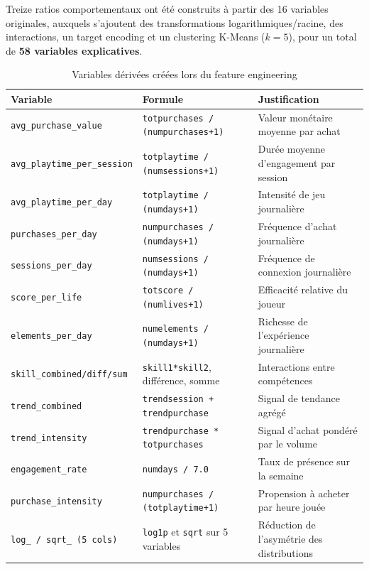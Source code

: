 \documentclass[11pt,a4paper]{article}
\newcommand{\code}[1]{\texttt{\small #1}}
\begin{document}
Treize ratios comportementaux ont été construits à partir des 16 variables
originales, auxquels s'ajoutent des transformations logarithmiques/racine,
des interactions, un target encoding et un clustering K-Means ($k=5$), pour
un total de \textbf{58 variables explicatives}.

\begin{table}[H]
\caption{Variables dérivées créées lors du feature engineering}
\label{tab:fe}
\centering\small
\begin{tabularx}{\linewidth}{L{4.2cm} L{4.6cm} X}
\toprule
{}
\textbf{Variable} & \textbf{Formule} & \textbf{Justification} \\
\midrule
\code{avg\_purchase\_value}       & \code{totpurchases / (numpurchases+1)}  & Valeur monétaire moyenne par achat \\
\code{avg\_playtime\_per\_session}& \code{totplaytime / (numsessions+1)}    & Durée moyenne d'engagement par session \\
\code{avg\_playtime\_per\_day}    & \code{totplaytime / (numdays+1)}        & Intensité de jeu journalière \\
\code{purchases\_per\_day}        & \code{numpurchases / (numdays+1)}       & Fréquence d'achat journalière \\
\code{sessions\_per\_day}         & \code{numsessions / (numdays+1)}        & Fréquence de connexion journalière \\
\code{score\_per\_life}           & \code{totscore / (numlives+1)}          & Efficacité relative du joueur \\
\code{elements\_per\_day}         & \code{numelements / (numdays+1)}        & Richesse de l'expérience journalière \\
\code{skill\_combined/diff/sum}   & \code{skill1*skill2}, différence, somme & Interactions entre compétences \\
\code{trend\_combined}            & \code{trendsession + trendpurchase}     & Signal de tendance agrégé \\
\code{trend\_intensity}           & \code{trendpurchase * totpurchases}     & Signal d'achat pondéré par le volume \\
\code{engagement\_rate}           & \code{numdays / 7.0}                    & Taux de présence sur la semaine \\
\code{purchase\_intensity}        & \code{numpurchases / (totplaytime+1)}   & Propension à acheter par heure jouée \\
\code{log\_ / sqrt\_ (5 cols)}    & \code{log1p} et \code{sqrt} sur 5 variables & Réduction de l'asymétrie des distributions \\
\bottomrule
\end{tabularx}
\end{table}
\end{document}

